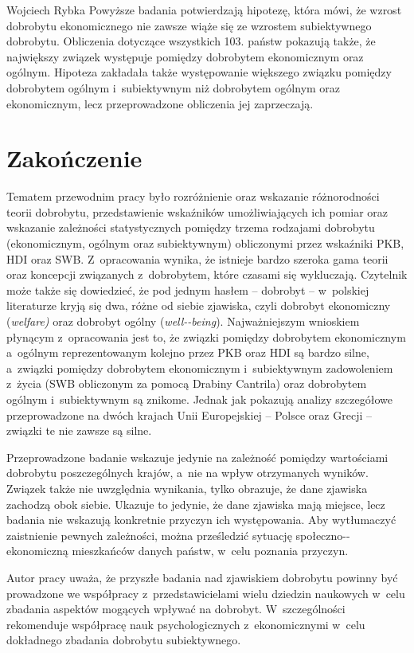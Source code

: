 \begin{artplenv}{Wojciech Rybka}
Powyższe badania potwierdzają hipotezę, która mówi, że wzrost dobrobytu ekonomicznego nie zawsze wiąże się
ze wzrostem subiektywnego dobrobytu. Obliczenia dotyczące wszystkich 103. państw pokazują także, że największy związek
występuje pomiędzy dobrobytem ekonomicznym oraz ogólnym. Hipoteza zakładała także występowanie większego związku
pomiędzy dobrobytem ogólnym i~subiektywnym niż dobrobytem ogólnym oraz ekonomicznym, lecz przeprowadzone obliczenia jej
zaprzeczają.

\section{Zakończenie}
Tematem przewodnim pracy było rozróżnienie oraz wskazanie różnorodności teorii dobrobytu, przedstawienie wskaźników
umożliwiających ich pomiar oraz wskazanie zależności statystycznych pomiędzy trzema rodzajami dobrobytu (ekonomicznym,
ogólnym oraz subiektywnym) obliczonymi przez wskaźniki PKB, HDI oraz SWB. Z~opracowania wynika, że istnieje bardzo
szeroka gama teorii oraz koncepcji związanych z~dobrobytem, które czasami się wykluczają. Czytelnik może także się
dowiedzieć, że pod jednym hasłem -- dobrobyt -- w~polskiej literaturze kryją się dwa, różne od siebie zjawiska, czyli
dobrobyt ekonomiczny (\textit{welfare)} oraz dobrobyt ogólny (\textit{well-\mbox{-being}}). Najważniejszym wnioskiem
płynącym z~opracowania jest to, że związki pomiędzy dobrobytem ekonomicznym a~ogólnym reprezentowanym kolejno przez PKB
oraz HDI są bardzo silne, a~związki pomiędzy dobrobytem ekonomicznym i~subiektywnym zadowoleniem z~życia (SWB
obliczonym za pomocą Drabiny Cantrila) oraz dobrobytem ogólnym i~subiektywnym są znikome. Jednak jak pokazują analizy
szczegółowe przeprowadzone na dwóch krajach Unii Europejskiej -- Polsce oraz Grecji -- związki te nie zawsze są silne. 

Przeprowadzone badanie wskazuje jedynie na zależność pomiędzy wartościami dobrobytu poszczególnych krajów, a~nie na
wpływ otrzymanych wyników. Związek także nie uwzględnia wynikania, tylko obrazuje, że dane zjawiska zachodzą obok
siebie. Ukazuje to jedynie, że dane zjawiska mają miejsce, lecz badania nie wskazują konkretnie przyczyn ich
występowania. Aby wytłumaczyć zaistnienie pewnych zależności, można prześledzić sytuację społeczno-\mbox{-ekonomiczną}
mieszkańców danych państw, w~celu poznania przyczyn. 

Autor pracy uważa, że przyszłe badania nad zjawiskiem dobrobytu powinny być prowadzone we współpracy z~przedstawicielami
wielu dziedzin naukowych w~celu zbadania aspektów mogących wpływać na dobrobyt. W~szczególności rekomenduje współpracę
nauk psychologicznych z~ekonomicznymi w~celu dokładnego zbadania dobrobytu subiektywnego.

\end{artplenv}

